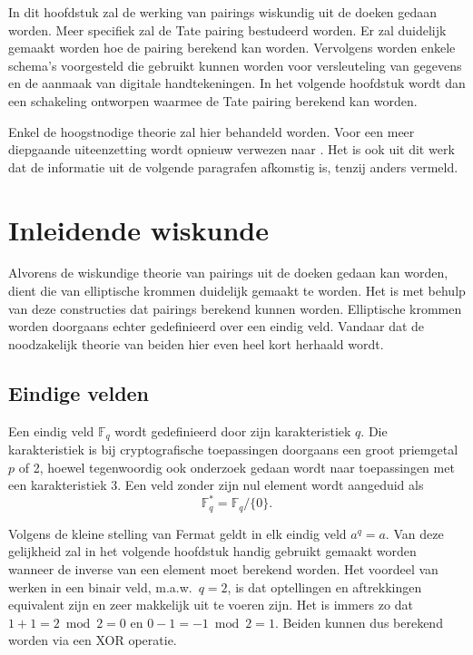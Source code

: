
In dit hoofdstuk zal de werking van pairings wiskundig uit de doeken gedaan worden. Meer specifiek zal de Tate pairing bestudeerd worden. Er zal duidelijk gemaakt worden hoe de pairing berekend kan worden. Vervolgens worden enkele schema's voorgesteld die gebruikt kunnen worden voor versleuteling van gegevens en de aanmaak van digitale handtekeningen. In het volgende hoofdstuk wordt dan een schakeling ontworpen waarmee de Tate pairing berekend kan worden.

Enkel de hoogstnodige theorie zal hier behandeld worden. Voor een meer diepgaande uiteenzetting wordt opnieuw verwezen naar \cite{maas}. Het is ook uit dit werk dat de informatie uit de volgende paragrafen afkomstig is, tenzij anders vermeld.

\section{Inleidende wiskunde}

Alvorens de wiskundige theorie van pairings uit de doeken gedaan kan worden, dient die van elliptische krommen duidelijk gemaakt te worden. Het is met behulp van deze constructies dat pairings berekend kunnen worden. Elliptische krommen worden doorgaans echter gedefinieerd over een eindig veld. Vandaar dat de noodzakelijk theorie van beiden hier even heel kort herhaald wordt.

\subsection{Eindige velden}

Een eindig veld $\mathbb{F}_q$ wordt gedefinieerd door zijn karakteristiek $q$. Die karakteristiek is bij cryptografische toepassingen doorgaans een groot priemgetal $p$ of 2, hoewel tegenwoordig ook onderzoek gedaan wordt naar toepassingen met een karakteristiek 3. Een veld zonder zijn nul element wordt aangeduid als
\[\mathbb{F}_q^* = \mathbb{F}_q / \{ 0 \}.\]

Volgens de kleine stelling van Fermat geldt in elk eindig veld $a^q = a$. Van deze gelijkheid zal in het volgende hoofdstuk handig gebruikt gemaakt worden wanneer de inverse van een element moet berekend worden. Het voordeel van werken in een binair veld, m.a.w.\ $q = 2$, is dat optellingen en aftrekkingen equivalent zijn en zeer makkelijk uit te voeren zijn. Het is immers zo dat $1 + 1 = 2 \bmod 2 = 0$ en $0 - 1 = -1 \bmod 2 = 1$. Beiden kunnen dus berekend worden via een XOR operatie.

